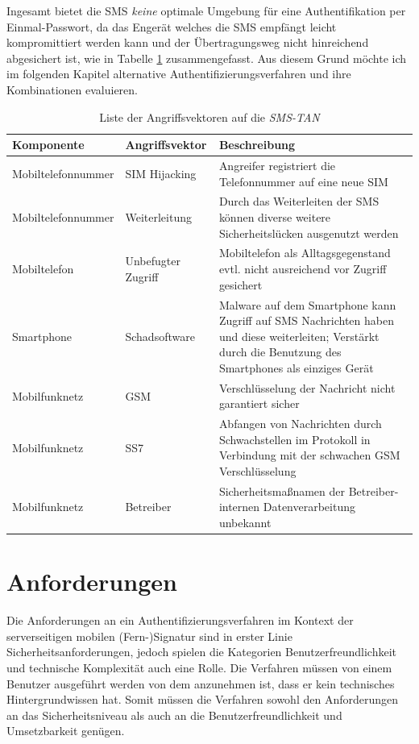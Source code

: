 \documentclass[11pt,a4paper,ngerman]{scrreprt}
\begin{document}
Ingesamt bietet die SMS \emph{keine} optimale Umgebung für eine Authentifikation per Einmal-Passwort, da das Engerät welches die SMS empfängt leicht kompromittiert werden kann und der Übertragungsweg nicht hinreichend abgesichert ist, wie in Tabelle \ref{table:AngriffsvektorenSMSTAN} zusammengefasst. Aus diesem Grund möchte ich im folgenden Kapitel alternative Authentifizierungsverfahren und ihre Kombinationen evaluieren.
\begin{table}[htbp]
    \begin{tabularx}{\textwidth}{ llX }
        \toprule
        Komponente & Angriffsvektor & Beschreibung  \\
        \midrule
        Mobiltelefonnummer & SIM Hijacking & Angreifer registriert die Telefonnummer auf eine neue SIM \\
        Mobiltelefonnummer & Weiterleitung & Durch das Weiterleiten der SMS können diverse weitere Sicherheitslücken ausgenutzt werden \\
        Mobiltelefon & Unbefugter Zugriff & Mobiltelefon als Alltagsgegenstand evtl. nicht ausreichend vor Zugriff gesichert \\
        Smartphone & Schadsoftware & Malware auf dem Smartphone kann Zugriff auf SMS Nachrichten haben und diese weiterleiten; Verstärkt durch die Benutzung des Smartphones als einziges Gerät \\
        Mobilfunknetz & GSM & Verschlüsselung der Nachricht nicht garantiert sicher \\
        Mobilfunknetz & SS7 & Abfangen von Nachrichten durch Schwachstellen im Protokoll in Verbindung mit der schwachen GSM Verschlüsselung \\
        Mobilfunknetz & Betreiber & Sicherheitsmaßnamen der Betreiber-internen Datenverarbeitung unbekannt \\
    \end{tabularx}
    \caption{Liste der Angriffsvektoren auf die \textit{SMS-TAN}}
    \label{table:AngriffsvektorenSMSTAN}
\end{table}
\clearpage

\section{Anforderungen}
Die Anforderungen an ein Authentifizierungsverfahren im Kontext der serverseitigen mobilen (Fern-)Signatur sind in erster Linie Sicherheitsanforderungen, jedoch spielen die Kategorien Benutzerfreundlichkeit und technische Komplexität auch eine Rolle. Die Verfahren müssen von einem Benutzer ausgeführt werden von dem anzunehmen ist, dass er kein technisches Hintergrundwissen hat. Somit müssen die Verfahren sowohl den Anforderungen an das Sicherheitsniveau als auch an die Benutzerfreundlichkeit und Umsetzbarkeit genügen. 
\end{document}
